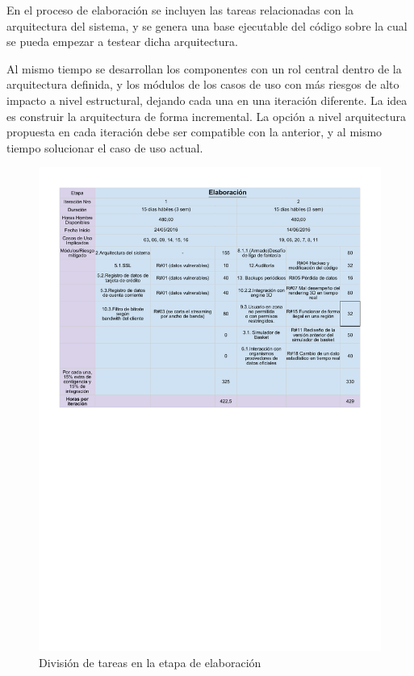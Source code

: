 En el proceso de elaboración se incluyen las tareas relacionadas con la arquitectura del sistema, y se genera una base ejecutable del código sobre la cual se pueda 
empezar a testear dicha arquitectura.

Al mismo tiempo se desarrollan los componentes con un rol central dentro de la arquitectura definida, y los módulos de los casos de uso con más riesgos
de alto impacto a nivel estructural, dejando cada una en una iteración diferente. La idea es construir la arquitectura de forma incremental. La opción a nivel arquitectura propuesta
en cada iteración debe ser compatible con la anterior, y al mismo tiempo solucionar el caso de uso actual.

\begin{figure}[h!]
   \includegraphics[scale=0.80]{imagenes/etapas-elaboracion.pdf}
   \caption{División de tareas en la etapa de elaboración}
\end{figure}

